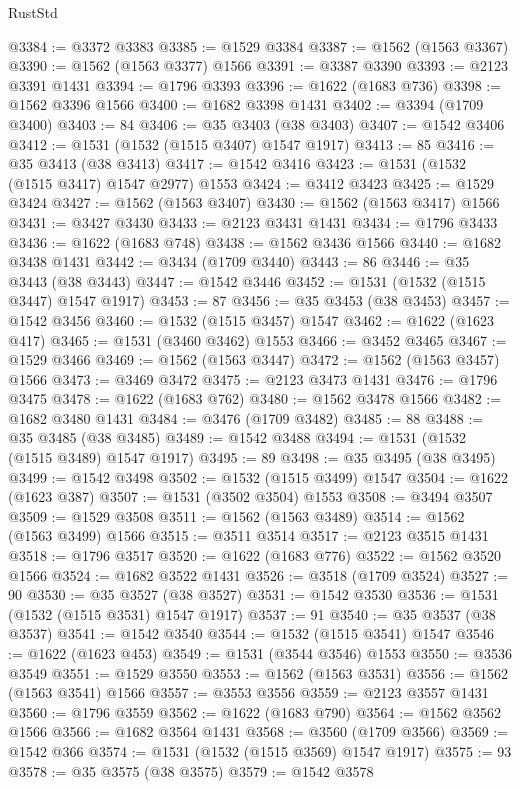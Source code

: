 \begin{lexlean}{RustStd}
\begin{coremodule}
{\begin{coremodule}
{{{{{{{{{{{{{{{{{{{{{{{{{{{{{{{{@3384 := @3372 @3383
@3385 := @1529 @3384
@3387 := @1562 (@1563 @3367)
@3390 := @1562 (@1563 @3377) @1566
@3391 := @3387 @3390
@3393 := @2123 @3391 @1431
@3394 := @1796 @3393
@3396 := @1622 (@1683 @736)
@3398 := @1562 @3396 @1566
@3400 := @1682 @3398 @1431
@3402 := @3394 (@1709 @3400)
@3403 := 84
@3406 := @35 @3403 (@38 @3403)
@3407 := @1542 @3406
@3412 := @1531 (@1532 (@1515 @3407) @1547 @1917)
@3413 := 85
@3416 := @35 @3413 (@38 @3413)
@3417 := @1542 @3416
@3423 := @1531 (@1532 (@1515 @3417) @1547 @2977) @1553
@3424 := @3412 @3423
@3425 := @1529 @3424
@3427 := @1562 (@1563 @3407)
@3430 := @1562 (@1563 @3417) @1566
@3431 := @3427 @3430
@3433 := @2123 @3431 @1431
@3434 := @1796 @3433
@3436 := @1622 (@1683 @748)
@3438 := @1562 @3436 @1566
@3440 := @1682 @3438 @1431
@3442 := @3434 (@1709 @3440)
@3443 := 86
@3446 := @35 @3443 (@38 @3443)
@3447 := @1542 @3446
@3452 := @1531 (@1532 (@1515 @3447) @1547 @1917)
@3453 := 87
@3456 := @35 @3453 (@38 @3453)
@3457 := @1542 @3456
@3460 := @1532 (@1515 @3457) @1547
@3462 := @1622 (@1623 @417)
@3465 := @1531 (@3460 @3462) @1553
@3466 := @3452 @3465
@3467 := @1529 @3466
@3469 := @1562 (@1563 @3447)
@3472 := @1562 (@1563 @3457) @1566
@3473 := @3469 @3472
@3475 := @2123 @3473 @1431
@3476 := @1796 @3475
@3478 := @1622 (@1683 @762)
@3480 := @1562 @3478 @1566
@3482 := @1682 @3480 @1431
@3484 := @3476 (@1709 @3482)
@3485 := 88
@3488 := @35 @3485 (@38 @3485)
@3489 := @1542 @3488
@3494 := @1531 (@1532 (@1515 @3489) @1547 @1917)
@3495 := 89
@3498 := @35 @3495 (@38 @3495)
@3499 := @1542 @3498
@3502 := @1532 (@1515 @3499) @1547
@3504 := @1622 (@1623 @387)
@3507 := @1531 (@3502 @3504) @1553
@3508 := @3494 @3507
@3509 := @1529 @3508
@3511 := @1562 (@1563 @3489)
@3514 := @1562 (@1563 @3499) @1566
@3515 := @3511 @3514
@3517 := @2123 @3515 @1431
@3518 := @1796 @3517
@3520 := @1622 (@1683 @776)
@3522 := @1562 @3520 @1566
@3524 := @1682 @3522 @1431
@3526 := @3518 (@1709 @3524)
@3527 := 90
@3530 := @35 @3527 (@38 @3527)
@3531 := @1542 @3530
@3536 := @1531 (@1532 (@1515 @3531) @1547 @1917)
@3537 := 91
@3540 := @35 @3537 (@38 @3537)
@3541 := @1542 @3540
@3544 := @1532 (@1515 @3541) @1547
@3546 := @1622 (@1623 @453)
@3549 := @1531 (@3544 @3546) @1553
@3550 := @3536 @3549
@3551 := @1529 @3550
@3553 := @1562 (@1563 @3531)
@3556 := @1562 (@1563 @3541) @1566
@3557 := @3553 @3556
@3559 := @2123 @3557 @1431
@3560 := @1796 @3559
@3562 := @1622 (@1683 @790)
@3564 := @1562 @3562 @1566
@3566 := @1682 @3564 @1431
@3568 := @3560 (@1709 @3566)
@3569 := @1542 @366
@3574 := @1531 (@1532 (@1515 @3569) @1547 @1917)
@3575 := 93
@3578 := @35 @3575 (@38 @3575)
@3579 := @1542 @3578
}}}}}}}}}}}}}}}}}}}}}}}}}}}}}}}}
\end{coremodule}}
\end{coremodule}
\end{lexlean}
